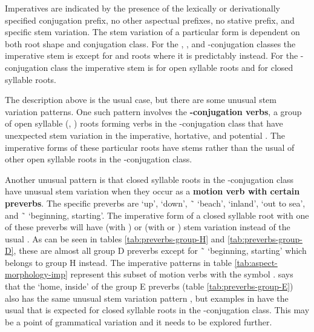 \begin{multicols}{2}
\noindent
Imperatives are indicated by the presence of the lexically or derivationally specified conjugation prefix, no other aspectual prefixes, no stative prefix, and specific stem variation.
The stem variation of a particular form is dependent on both root shape and conjugation class.
For the , , and -conjugation classes the imperative stem is  except for  and  roots where it is predictably  instead.
For the -conjugation class the imperative stem is  for open syllable roots and  for closed syllable roots.

The description above is the usual case, but there are some unusual stem variation patterns.
One such pattern involves the \textbf{-conjugation verbs}, a group of open syllable (, ) roots forming verbs in the -conjugation class that have unexpected stem variation in the imperative, hortative, and potential \parencites[204, 269–270]{leer:1991}[155–156, 160, 163–164]{crippen:2019}.
The imperative forms of these particular roots have  stems rather than the usual  of other open syllable roots in the -conjugation class.

Another unusual pattern is that closed syllable roots in the -conjugation class have unusual stem variation when they occur as a \textbf{motion verb with certain preverbs}.
The specific preverbs are  ‘up’,  ‘down’,  \~\  ‘beach’,  ‘inland’,  ‘out to sea’, and  \~\  ‘beginning, starting’.
The imperative form of a closed syllable root with one of these preverbs will have  (with ) or  (with  or ) stem variation instead of the usual  \parencites[176]{story:1966}[209]{leer:1991}.
As can be seen in tables \ref{tab:preverbs-group-H} and \ref{tab:preverbs-group-D}, these are almost all group D preverbs except for  \~\  ‘beginning, starting’ which belongs to group H instead.
The imperative patterns in table \ref{tab:aspect-morphology-imp} represent this subset of motion verbs with the symbol .
\citeauthor{story:1966} says that the  ‘home, inside’ of the group E preverbs (table \ref{tab:preverbs-group-E}) also has the same unusual stem variation pattern \parencite[176]{story:1966}, but examples in \cite{eggleston:2017} have the usual  that is expected for closed syllable roots in the -conjugation class.
This may be a point of grammatical variation and it needs to be explored further.


\end{multicols}

